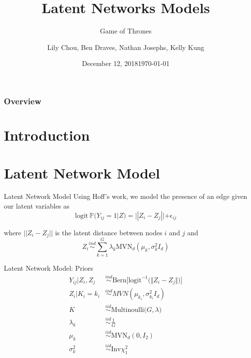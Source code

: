 \documentclass[handout]{beamer}
\title{Latent Networks Models}
\subtitle{Game of Thrones}
\author{Lily Chou, Ben Draves, Nathan Josephs, Kelly Kung}
\date{December 12, 2018}
\institute[Boston University] 
{
  Department of Mathematics and Statistics\\
  Boston University
  }
\date{\today}
\begin{document}
%
%
\begin{frame}
  \titlepage
\end{frame}
\begin{frame}
\frametitle{Overview}
\tableofcontents
\end{frame}

\section{Introduction}


%
%

\section{Latent Network Model}
\begin{frame}{Latent Network Model}
Using Hoff's work, we model the presence of an edge given our latent variables as
\[\text{logit} \ \mathbb{P}(Y_{ij} = 1|Z) = ||Z_i - Z_j|| + \epsilon_{ij}\]

where $||Z_i - Z_j||$ is the latent distance between nodes $i$ and $j$ and 
\[Z_i \overset{ind}{\sim}\sum_{k=1}^G \lambda_k\text{MVN}_d(\mu_k,\sigma_k^2I_d)\]

\end{frame}

\begin{frame}{Latent Network Model: Priors}
\begin{align*}
Y_{ij} | Z_i, Z_j &\overset{ind}\sim \text{Bern}\Big[\text{logit}^{-1}\big(\Vert Z_i - Z_j \Vert\big)\Big] \\
Z_i | K_i = k_i &\overset{ind}\sim MVN(\mu_{k_i}, \sigma_{k_i}^2 I_d) \\
K &\overset{iid}\sim \text{Multinoulli}\big(G, \lambda \big) \\
\lambda_k &\overset{iid}\sim \frac{1}{G} \\
\mu_k &\overset{iid}\sim \text{MVN}_d(0, I_2) \\
\sigma_k^2 &\overset{iid}\sim \text{Inv} \chi^2_1
\end{align*}
\end{frame}
\end{document}
